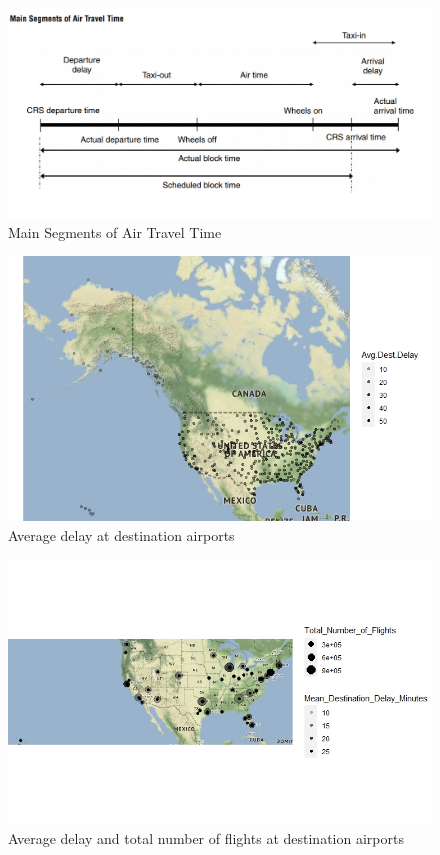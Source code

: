\documentclass[12pt, a4paper, openany]{book}
\begin{document}
			\begin{figure}[h]
			\centering
	 		\includegraphics[width = 1 \textwidth]{../figures/Main Segments of Air Travel Time}
	 		\caption{Main Segments of Air Travel Time}
	 		\end{figure}
			\begin{figure}[h]
			\centering
	 		\includegraphics[width = 1 \textwidth]{../figures/PLOTS FOR REPORT/Chapter 4/Figure 4.22}
	 		\caption{Average delay at destination airports}
	 		\end{figure}

			\begin{figure}[h]
			\centering
	 		\includegraphics[width = 1\textwidth]{../figures/PLOTS FOR REPORT/Chapter 4/Figure 4.23}
	 		\caption{Average delay and total number of flights at destination airports}
	 		\end{figure}
\end{document}
